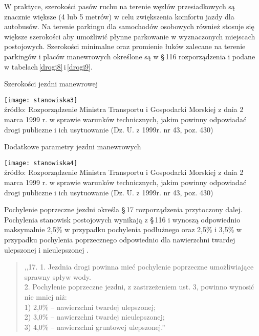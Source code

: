 \documentclass[twoside,12pt]{article}
\begin{document}
	W praktyce, szerokości pasów ruchu na terenie węzłów przesiadkowych są znacznie większe (4 lub 5 metrów) w celu zwiększenia komfortu jazdy dla autobusów. Na terenie parkingu dla samochodów osobowych również stosuje się większe szerokości aby umożliwić płynne parkowanie w wyznaczonych miejscach postojowych. Szerokości minimalne oraz promienie łuków zalecane na terenie parkingów i placów manewrowych określone są w §\,116 rozporządzenia i podane w tabelach\,\ref{drogi8}\,i\,\ref{drogi9}.
	\begin{table}[H]
		\centering
		\caption{Szerokości jezdni manewrowej}
		\texttt{[image: stanowiska3]}\\
		\footnotesize{źródło: Rozporządzenie Ministra Transportu i Gospodarki Morskiej z dnia 2 marca 1999 r. w sprawie warunków %
		 technicznych, jakim powinny odpowiadać drogi publiczne i ich usytuowanie (Dz. U. z 1999r. nr 43, poz. 430) %
		 \cite{rozporzadzenie_drogi}}
		\label{drogi8}
	\end{table}
	
	\begin{table}[H]
		\centering
		\caption{Dodatkowe parametry jezdni manewrowych}
		\texttt{[image: stanowiska4]}\\
		\footnotesize{źródło: Rozporządzenie Ministra Transportu i Gospodarki Morskiej z dnia 2 marca 1999 r. w sprawie warunków %
		technicznych, jakim powinny odpowiadać drogi publiczne i ich usytuowanie (Dz. U. z 1999r. nr 43, poz. 430) %
		\cite{rozporzadzenie_drogi}}
		\label{drogi9}
	\end{table}
	
	\begin{samepage}Pochylenie poprzeczne jezdni określa §\,17 rozporządzenia przytoczony dalej. Pochylenia stanowisk postojowych wynikają z §\,116 i wynoszą odpowiednio maksymalnie 2,5\% w przypadku pochylenia podłużnego oraz 2,5\% i 3,5\% w przypadku pochylenia poprzecznego odpowiednio dla nawierzchni twardej ulepszonej i nieulepszonej \cite{rozporzadzenie_drogi}.
		\begin{quote}
	 			,,17. 1. Jezdnia drogi powinna mieć pochylenie poprzeczne umożliwiające sprawny spływ wody.\\
				2. Pochylenie poprzeczne jezdni, z zastrzeżeniem ust. 3, powinno wynosić nie mniej niż:\\
				1) 2,0\% – nawierzchni twardej ulepszonej;\\
				2) 3,0\% – nawierzchni twardej nieulepszonej;\\
				3) 4,0\% – nawierzchni gruntowej ulepszonej.'' \cite{rozporzadzenie_drogi}
		\end{quote}\end{samepage}
	
\end{document}
